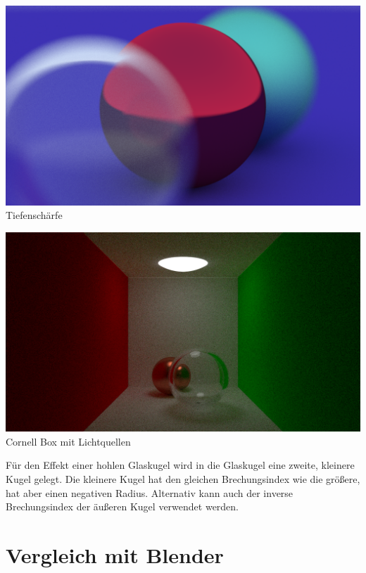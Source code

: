 \documentclass[a4paper, 10pt]{article}
\begin{document}
\begin{minipage}[t]{0.5\linewidth}
    \centering
    \includegraphics[width=\linewidth]{images/blur.png}
    Tiefenschärfe

    \includegraphics[width=\linewidth]{images/cornell.png}
    Cornell Box mit Lichtquellen

\end{minipage}

Für den Effekt einer hohlen Glaskugel wird in die Glaskugel eine zweite, kleinere Kugel gelegt.
Die kleinere Kugel hat den gleichen Brechungsindex wie die größere, hat aber einen negativen Radius.
Alternativ kann auch der inverse Brechungsindex der äußeren Kugel verwendet werden.

\section{Vergleich mit Blender}
\end{document}
